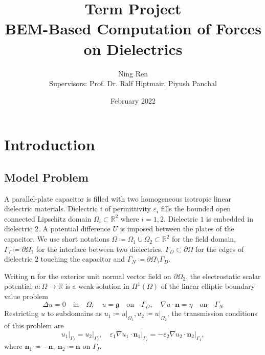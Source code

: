 \documentclass{article}
\title{Term Project\\\textbf{BEM-Based Computation of Forces on Dielectrics}}
\author{Ning Ren\\[1ex]Supervisors: Prof. Dr. Ralf Hiptmair, Piyush Panchal}
\date{February 2022}
\theoremstyle{remark}
\newcommand{\n}{\boldsymbol{n}}
\newcommand{\argg}{\mathfrak{g}}
\begin{document}
\maketitle
\tableofcontents

\newpage

\section{Introduction}
\subsection{Model Problem}
A parallel-plate capacitor is filled with two homogeneous isotropic linear dielectric materials. Dielectric $i$ of permittivity $\varepsilon_i$ fills the bounded open connected Lipschitz domain $\Omega_i\subset\mathbb{R}^2$ where $i=1,2$. Dielectric $1$ is embedded in dielectric $2$. A potential difference $U$ is imposed between the plates of the capacitor. We use short notations $\Omega\coloneqq\Omega_1\cup\Omega_2\subset\mathbb{R}^2$ for the field domain, $\Gamma_I\coloneqq\partial\Omega_1$ for the interface between two dielectrics, $\Gamma_D\subset\partial\Omega$ for the edges of dielectric $2$ touching the capacitor and $\Gamma_N\coloneqq\partial\Omega\setminus\Gamma_D$.

Writing $\n$ for the exterior unit normal vector field on $\partial\Omega_2$, the electrostatic scalar potential $u:\Omega\to\mathbb{R}$ is a weak solution in $H^1(\Omega)$ of the linear elliptic boundary value problem
\begin{equation}
\label{eq:bvp}
    \Delta u =0\quad\text{in}\quad\Omega,\quad u=\argg\quad\text{on}\quad\Gamma_D,\quad\nabla u\cdot\n=\eta\quad\text{on}\quad\Gamma_N
\end{equation}
Restricting $u$ to subdomains as $u_1\coloneqq \left.u\right|_{\Omega_1}, u_2\coloneqq \left.u\right|_{\Omega_2}$, the transmission conditions of this problem are
\begin{equation}
\label{eq:trans-cond}
    \left.u_1\right|_{\Gamma_I} = \left.u_2\right|_{\Gamma_I},\quad\varepsilon_1\left.\nabla u_1\cdot\n_1\right|_{\Gamma_I}=-\varepsilon_2\left.\nabla u_2\cdot\n_2\right|_{\Gamma_I},
\end{equation}
where $\n_1\coloneqq-\n,~\n_2\coloneqq\n$ on $\Gamma_I$.
\end{document}
